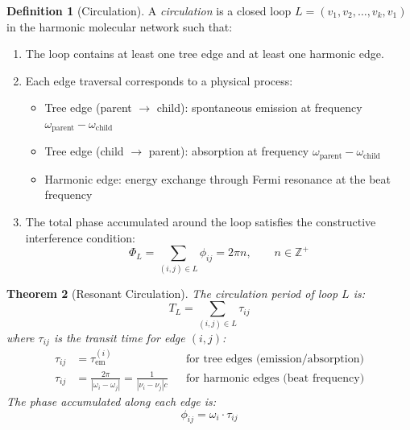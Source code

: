 \documentclass[11pt,twocolumn,a4paper]{article}
\newtheorem{theorem}{Theorem}[section]
\theoremstyle{definition}
\newtheorem{definition}[theorem]{Definition}
\theoremstyle{remark}
\newcommand{\Integer}{\mathbb{Z}}
\newcommand{\tem}{\tau_{\mathrm{em}}}
\begin{document}
\begin{definition}[Circulation]
\label{def:circulation}
A \emph{circulation} is a closed loop $L = (v_1, v_2, \ldots, v_k, v_1)$ in the harmonic molecular network such that:
\begin{enumerate}[nosep]
\item The loop contains at least one tree edge and at least one harmonic edge.
\item Each edge traversal corresponds to a physical process:
\begin{itemize}[nosep]
\item Tree edge (parent $\to$ child): spontaneous emission at frequency $\omega_{\mathrm{parent}} - \omega_{\mathrm{child}}$
\item Tree edge (child $\to$ parent): absorption at frequency $\omega_{\mathrm{parent}} - \omega_{\mathrm{child}}$
\item Harmonic edge: energy exchange through Fermi resonance at the beat frequency
\end{itemize}
\item The total phase accumulated around the loop satisfies the constructive interference condition:
\begin{equation}
\Phi_L = \sum_{(i,j) \in L} \phi_{ij} = 2\pi n, \qquad n \in \Integer^+
\label{eq:constructive_interference}
\end{equation}
\end{enumerate}
\end{definition}

\begin{theorem}[Resonant Circulation]
\label{thm:resonant_circulation}
The circulation period of loop $L$ is:
\begin{equation}
T_L = \sum_{(i,j) \in L} \tau_{ij}
\label{eq:circulation_period}
\end{equation}
where $\tau_{ij}$ is the transit time for edge $(i,j)$:
\begin{align}
\tau_{ij} &= \tem^{(i)} && \text{for tree edges (emission/absorption)} \label{eq:tree_transit} \\
\tau_{ij} &= \frac{2\pi}{|\omega_i - \omega_j|} = \frac{1}{|\nu_i - \nu_j| c} && \text{for harmonic edges (beat frequency)} \label{eq:harmonic_transit}
\end{align}
The phase accumulated along each edge is:
\begin{equation}
\phi_{ij} = \omega_i \cdot \tau_{ij}
\label{eq:phase_per_edge}
\end{equation}
\end{theorem}
\end{document}
